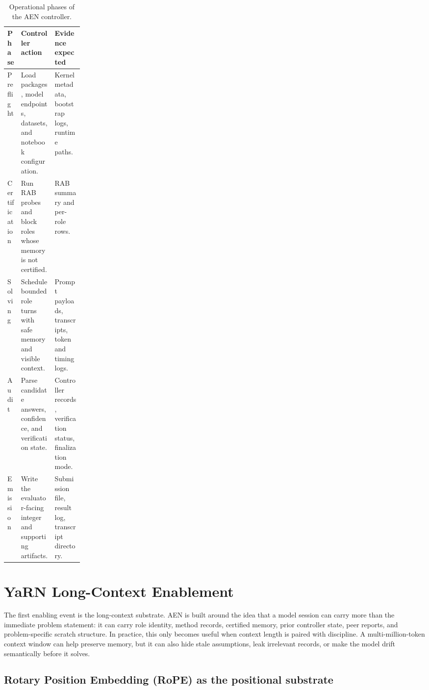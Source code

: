 \documentclass[11pt]{article}
\newcommand{\rab}{RAB}
\begin{document}
\begin{table}[H]
\centering
\small
\renewcommand{\arraystretch}{1.16}
\begin{tabularx}{\linewidth}{p{0.18\linewidth}X X}
\toprule
Phase & Controller action & Evidence expected \\
\midrule
Preflight & Load packages, model endpoints, datasets, and notebook configuration. & Kernel metadata, bootstrap logs, runtime paths. \\
Certification & Run \rab{} probes and block roles whose memory is not certified. & RAB summary and per-role rows. \\
Solving & Schedule bounded role turns with safe memory and visible context. & Prompt payloads, transcripts, token and timing logs. \\
Audit & Parse candidate answers, confidence, and verification state. & Controller records, verification status, finalization mode. \\
Emission & Write the evaluator-facing integer and supporting artifacts. & Submission file, result log, transcript directory. \\
\bottomrule
\end{tabularx}
\caption{Operational phases of the AEN controller.}
\label{tab:phases}
\end{table}

\clearpage

\section{YaRN Long-Context Enablement}

The first enabling event is the long-context substrate. AEN is built around the idea that a model session can carry more than the immediate problem statement: it can carry role identity, method records, certified memory, prior controller state, peer reports, and problem-specific scratch structure. In practice, this only becomes useful when context length is paired with discipline. A multi-million-token context window can help preserve memory, but it can also hide stale assumptions, leak irrelevant records, or make the model drift semantically before it solves.

\subsection{Rotary Position Embedding (RoPE) as the positional substrate}
\end{document}
